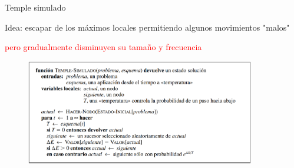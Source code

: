\begin{frame}{Temple simulado}
    
    Idea: escapar de los máximos locales permitiendo algunos movimientos "malos"
    
    \textcolor{red}{pero gradualmente disminuyen su tamaño y frecuencia}
  
    \begin{figure}[t]
\centering
\includegraphics[width=10cm]{8_image_algo.PNG}
\end{figure}
    
\end{frame}